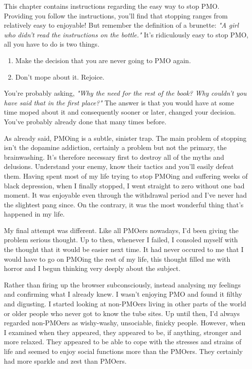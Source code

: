 \documentclass[easypeasy]{subfiles}
\begin{document}
This chapter contains instructions regarding the easy way to stop PMO. Providing you follow the instructions, you'll find that stopping ranges from relatively easy to enjoyable! But remember the definition of a brunette: \textit{"A girl who didn't read the instructions on the bottle."} It's ridiculously easy to stop PMO, all you have to do is two things.

\begin{enumerate}
  \item Make the decision that you are never going to PMO again.
  \item Don't mope about it. Rejoice.
\end{enumerate}

You're probably asking, \textit{"Why the need for the rest of the book? Why couldn't you have said that in the first place?"} The answer is that you would have at some time moped about it and consequently sooner or later, changed your decision. You've probably already done that many times before.

As already said, PMOing is a subtle, sinister trap. The main problem of stopping isn't the dopamine addiction, certainly a problem but not the primary, the brainwashing. It's therefore necessary first to destroy all of the myths and delusions. Understand your enemy, know their tactics and you'll easily defeat them. Having spent most of my life trying to stop PMOing and suffering weeks of black depression, when I finally stopped, I went straight to zero without one bad moment. It was enjoyable even through the withdrawal period and I've never had the slightest pang since. On the contrary, it was the most wonderful thing that's happened in my life.

My final attempt was different. Like all PMOers nowadays, I'd been giving the problem serious thought. Up to then, whenever I failed, I consoled myself with the thought that it would be easier next time. It had never occured to me that I would have to go on PMOing the rest of my life, this thought filled me with horror and I begun thinking very deeply about the subject.

Rather than firing up the browser subconsciously, instead analysing my feelings and confirming what I already knew. I wasn't enjoying PMO and found it filthy and digusting. I started looking at non-PMOers living in other parts of the world or older people who never got to know the tube sites. Up until then, I'd always regarded non-PMOers as wishy-washy, unsociable, finicky people. However, when I examined when they appeared, they appeared to be, if anything, stronger and more relaxed. They appeared to be able to cope with the stresses and strains of life and seemed to enjoy social functions more than the PMOers. They certainly had more sparkle and zest than PMOers.
\end{document}
